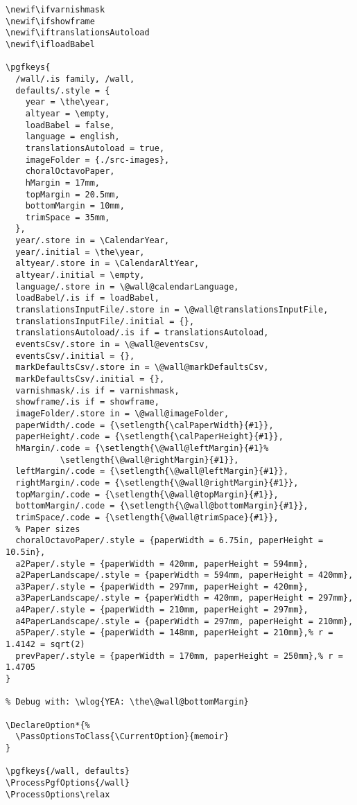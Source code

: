 \documentclass[11pt,oneside]{memoir-article}
\begin{document}
\begin{verbatim}
\newif\ifvarnishmask
\newif\ifshowframe
\newif\iftranslationsAutoload
\newif\ifloadBabel

\pgfkeys{
  /wall/.is family, /wall,
  defaults/.style = {
    year = \the\year,
    altyear = \empty,
    loadBabel = false,
    language = english,
    translationsAutoload = true,
    imageFolder = {./src-images},
    choralOctavoPaper,
    hMargin = 17mm,
    topMargin = 20.5mm,
    bottomMargin = 10mm,
    trimSpace = 35mm,
  },
  year/.store in = \CalendarYear,
  year/.initial = \the\year,
  altyear/.store in = \CalendarAltYear,
  altyear/.initial = \empty,
  language/.store in = \@wall@calendarLanguage,
  loadBabel/.is if = loadBabel,
  translationsInputFile/.store in = \@wall@translationsInputFile,
  translationsInputFile/.initial = {},
  translationsAutoload/.is if = translationsAutoload,
  eventsCsv/.store in = \@wall@eventsCsv,
  eventsCsv/.initial = {},
  markDefaultsCsv/.store in = \@wall@markDefaultsCsv,
  markDefaultsCsv/.initial = {},
  varnishmask/.is if = varnishmask,
  showframe/.is if = showframe,
  imageFolder/.store in = \@wall@imageFolder,
  paperWidth/.code = {\setlength{\calPaperWidth}{#1}},
  paperHeight/.code = {\setlength{\calPaperHeight}{#1}},
  hMargin/.code = {\setlength{\@wall@leftMargin}{#1}%
		   \setlength{\@wall@rightMargin}{#1}},
  leftMargin/.code = {\setlength{\@wall@leftMargin}{#1}},
  rightMargin/.code = {\setlength{\@wall@rightMargin}{#1}},
  topMargin/.code = {\setlength{\@wall@topMargin}{#1}},
  bottomMargin/.code = {\setlength{\@wall@bottomMargin}{#1}},
  trimSpace/.code = {\setlength{\@wall@trimSpace}{#1}},
  % Paper sizes
  choralOctavoPaper/.style = {paperWidth = 6.75in, paperHeight = 10.5in},
  a2Paper/.style = {paperWidth = 420mm, paperHeight = 594mm},
  a2PaperLandscape/.style = {paperWidth = 594mm, paperHeight = 420mm},
  a3Paper/.style = {paperWidth = 297mm, paperHeight = 420mm},
  a3PaperLandscape/.style = {paperWidth = 420mm, paperHeight = 297mm},
  a4Paper/.style = {paperWidth = 210mm, paperHeight = 297mm},
  a4PaperLandscape/.style = {paperWidth = 297mm, paperHeight = 210mm},
  a5Paper/.style = {paperWidth = 148mm, paperHeight = 210mm},% r = 1.4142 = sqrt(2)
  prevPaper/.style = {paperWidth = 170mm, paperHeight = 250mm},% r = 1.4705
}

% Debug with: \wlog{YEA: \the\@wall@bottomMargin}

\DeclareOption*{%
  \PassOptionsToClass{\CurrentOption}{memoir}
}

\pgfkeys{/wall, defaults}
\ProcessPgfOptions{/wall}
\ProcessOptions\relax
\end{verbatim}
\end{document}
